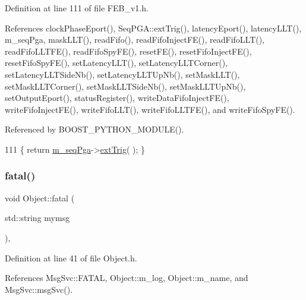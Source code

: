 Definition at line 111 of file F\+E\+B\+\_\+v1.\+h.



References clock\+Phase\+Eport(), Seq\+P\+G\+A\+::ext\+Trig(), latency\+Eport(), latency\+L\+L\+T(), m\+\_\+seq\+Pga, mask\+L\+L\+T(), read\+Fifo(), read\+Fifo\+Inject\+F\+E(), read\+Fifo\+L\+L\+T(), read\+Fifo\+L\+L\+T\+F\+E(), read\+Fifo\+Spy\+F\+E(), reset\+F\+E(), reset\+Fifo\+Inject\+F\+E(), reset\+Fifo\+Spy\+F\+E(), set\+Latency\+L\+L\+T(), set\+Latency\+L\+L\+T\+Corner(), set\+Latency\+L\+L\+T\+Side\+Nb(), set\+Latency\+L\+L\+T\+Up\+Nb(), set\+Mask\+L\+L\+T(), set\+Mask\+L\+L\+T\+Corner(), set\+Mask\+L\+L\+T\+Side\+Nb(), set\+Mask\+L\+L\+T\+Up\+Nb(), set\+Output\+Eport(), status\+Register(), write\+Data\+Fifo\+Inject\+F\+E(), write\+Fifo\+Inject\+F\+E(), write\+Fifo\+L\+L\+T(), write\+Fifo\+L\+L\+T\+F\+E(), and write\+Fifo\+Spy\+F\+E().



Referenced by B\+O\+O\+S\+T\+\_\+\+P\+Y\+T\+H\+O\+N\+\_\+\+M\+O\+D\+U\+L\+E().


\begin{DoxyCode}
111 \{ \textcolor{keywordflow}{return} \hyperlink{classFEB__v1_a6c7804ac86796f233a8393043adf2e77}{m\_seqPga}->\hyperlink{classSeqPGA_ae2e0917c379649d106539cc3b8b9ca3c}{extTrig}( ); \}
\end{DoxyCode}
\mbox{\label{classObject_aad5a16aac7516ce65bd5ec02ab07fc80}} 
\subsubsection{\texorpdfstring{fatal()}{fatal()}\hspace{0.1cm}{\footnotesize\ttfamily [1/2]}}
{\footnotesize\ttfamily void Object\+::fatal (\begin{DoxyParamCaption}\item[{std\+::string}]{mymsg }\end{DoxyParamCaption})\hspace{0.3cm}{\ttfamily [inline]}, {\ttfamily [inherited]}}



Definition at line 41 of file Object.\+h.



References Msg\+Svc\+::\+F\+A\+T\+AL, Object\+::m\+\_\+log, Object\+::m\+\_\+name, and Msg\+Svc\+::msg\+Svc().



